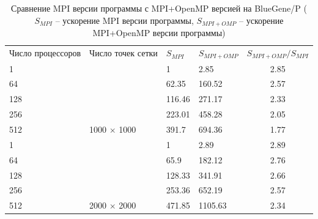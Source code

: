 \documentclass[12pt, a4paper]{article}
\begin{document}
        \begin{table}[H]
            \centering
            \caption{Сравнение MPI версии программы с MPI+OpenMP версией на BlueGene/P ($S_{MPI}$ -- ускорение MPI версии программы, $S_{MPI+OMP}$ -- ускорение MPI+OpenMP версии программы)}
            \label{tab:bg_mpi_to_omp_500}
            \begin{tabular}{llllc}
            \rowcolor[HTML]{C0C0C0}
            Число процессоров & Число точек сетки                    & $S_{MPI}$ & $S_{MPI+OMP}$ & \multicolumn{1}{l}{\cellcolor[HTML]{C0C0C0}$S_{MPI+OMP}/S_{MPI}$} \\
            \rowcolor[HTML]{EFEFEF}
            1                 &                                      & 1         & 2.85          & 2.85                                                              \\
            64                &                                      & 62.35     & 160.52        & 2.57                                                              \\
            128               &                                      & 116.46    & 271.17        & 2.33                                                              \\
            256               &                                      & 223.01    & 458.28        & 2.05                                                              \\
            512               & \multirow{-4}{*}{1000 $\times$ 1000} & 391.7     & 694.36        & 1.77                                                              \\
            \rowcolor[HTML]{EFEFEF}
            1                 &                                      & 1         & 2.89          & 2.89                                                              \\
            64                &                                      & 65.9      & 182.12        & 2.76                                                              \\
            128               &                                      & 128.33    & 341.91        & 2.66                                                              \\
            256               &                                      & 253.36    & 652.19        & 2.57                                                              \\
            512               & \multirow{-4}{*}{2000 $\times$ 2000} & 471.85    & 1105.63       & 2.34
            \end{tabular}
        \end{table}
\end{document}
